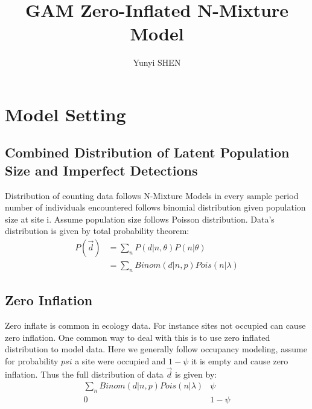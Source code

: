 \documentclass[]{article}
\title{GAM Zero-Inflated N-Mixture Model}
\author{Yunyi SHEN}
\begin{document}
\maketitle
\section{Model Setting}
\subsection{Combined Distribution of Latent Population Size and Imperfect Detections}
Distribution of counting data follows N-Mixture Models in every sample period number of individuals encountered follows binomial distribution given population size at site i. Assume population size follows Poisson distribution. Data's distribution is given by total probability theorem:
\begin{equation}
	\begin{aligned}
	P(\vec{d})&=\sum_{n}P(d|n,\theta)P(n|\theta)\\
	&=\sum_{n}Binom(d|n,p)Pois(n|\lambda)
	\end{aligned}
\end{equation}

\subsection{Zero Inflation}
Zero inflate is common in ecology data. For instance sites not occupied can cause zero inflation. One common way to deal with this is to use zero inflated distribution to model data. Here we generally follow occupancy modeling, assume for probability $psi$ a site were occupied and $1-\psi$ it is empty and cause zero inflation. Thus the full distribution of data $\vec{d}$ is given by:
\begin{equation}
	\begin{matrix}
	\sum_{n}Binom(d|n,p)Pois(n|\lambda) & \psi\\
	0 & 1-\psi
	\end{matrix}
\end{equation}
\end{document}
